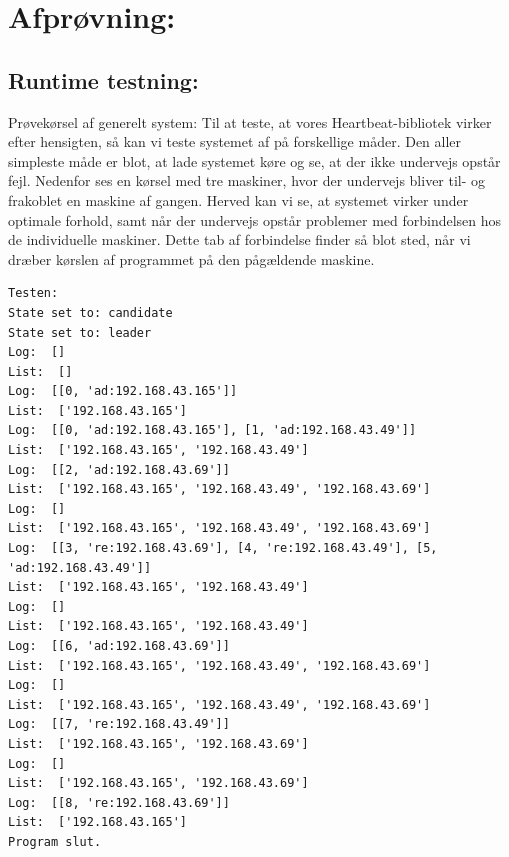 \documentclass[a4paper,12pt]{article}
\begin{document}
\section{Afprøvning:} 
\subsection{Runtime testning:}
Prøvekørsel af generelt system:
Til at teste, at vores Heartbeat-bibliotek virker efter hensigten, så kan vi teste systemet af på forskellige måder.
Den aller simpleste måde er blot, at lade systemet køre og se, at der ikke undervejs opstår fejl.
Nedenfor ses en kørsel med tre maskiner, hvor der undervejs bliver til- og frakoblet en maskine af gangen. Herved kan vi se, at systemet virker under optimale forhold, samt når der undervejs opstår problemer med forbindelsen hos de individuelle maskiner. 
Dette tab af forbindelse finder så blot sted, når vi dræber kørslen af programmet på den pågældende maskine.
\begin{lstlisting}
Testen:
State set to: candidate
State set to: leader
Log:  []
List:  []
Log:  [[0, 'ad:192.168.43.165']]
List:  ['192.168.43.165']
Log:  [[0, 'ad:192.168.43.165'], [1, 'ad:192.168.43.49']]
List:  ['192.168.43.165', '192.168.43.49']
Log:  [[2, 'ad:192.168.43.69']]
List:  ['192.168.43.165', '192.168.43.49', '192.168.43.69']
Log:  []
List:  ['192.168.43.165', '192.168.43.49', '192.168.43.69']
Log:  [[3, 're:192.168.43.69'], [4, 're:192.168.43.49'], [5, 'ad:192.168.43.49']]
List:  ['192.168.43.165', '192.168.43.49']
Log:  []
List:  ['192.168.43.165', '192.168.43.49']
Log:  [[6, 'ad:192.168.43.69']]
List:  ['192.168.43.165', '192.168.43.49', '192.168.43.69']
Log:  []
List:  ['192.168.43.165', '192.168.43.49', '192.168.43.69']
Log:  [[7, 're:192.168.43.49']]
List:  ['192.168.43.165', '192.168.43.69']
Log:  []
List:  ['192.168.43.165', '192.168.43.69']
Log:  [[8, 're:192.168.43.69']]
List:  ['192.168.43.165']
Program slut.
\end{lstlisting}
\end{document}

